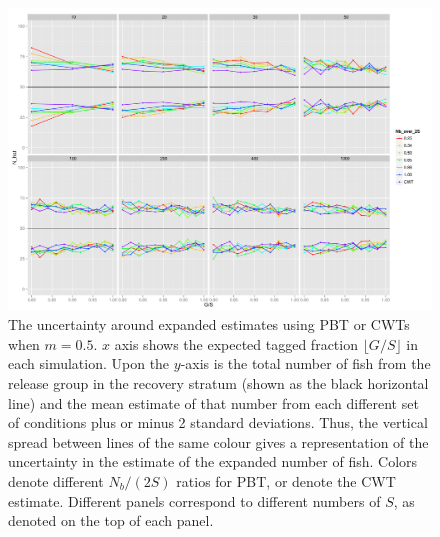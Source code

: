 \documentclass[11pt]{article}
\begin{document}
\begin{figure}
\includegraphics[width = .93\textwidth]{./images/sd_line_horns_m_0_5.pdf}
\caption{The uncertainty around expanded estimates using PBT or CWTs when $m = 0.5$.  $x$ axis shows the
expected tagged fraction $\lfloor G/S \rfloor$ in each simulation. Upon the $y$-axis is the total number of fish from the
release group in the recovery stratum (shown as the black horizontal line) and the mean estimate of that number from each different set of 
conditions plus or minus 2 standard deviations.  Thus, the vertical spread between lines of the same colour gives a representation
of the uncertainty in the estimate of the expanded number of fish. Colors denote different $N_b/(2S)$ ratios for PBT, or denote
the CWT estimate.  Different
panels correspond to different numbers of $S$, as denoted on the top of each panel.
\label{fig:horn0.5}}
\end{figure}
\end{document}
